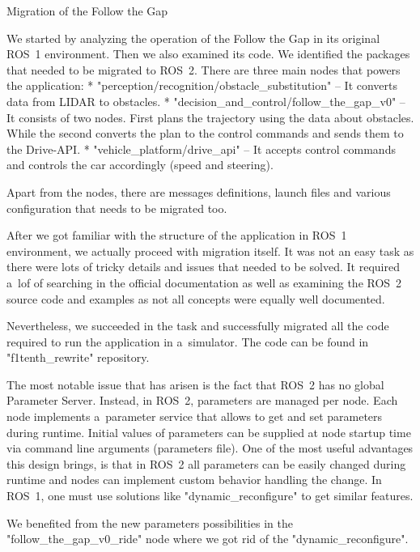  Migration of the Follow the Gap

We started by analyzing the operation of the Follow the Gap in its original ROS~1 environment.
Then we also examined its code. We identified the packages that needed to be migrated to ROS~2.
There are three main nodes that powers the application:
\begitems
* "perception/recognition/obstacle_substitution" – It converts data from LIDAR to obstacles.
* "decision_and_control/follow_the_gap_v0" – It consists of two nodes. First plans the trajectory using the data
about obstacles.
While the second converts the plan to the control commands and sends them to the Drive-API.
* "vehicle_platform/drive_api" – It accepts control commands and controls the car accordingly (speed and steering).
\enditems

Apart from the nodes, there are messages definitions, launch files and various configuration that needs to be
migrated too.

After we got familiar with the structure of the application in ROS~1 environment, we actually proceed with migration
itself. It was not an easy task as there were lots of tricky details and issues that needed to be solved.
It required a~lof of searching in the official documentation as well as examining the ROS~2 source code and examples
as not all concepts were equally well documented.

Nevertheless, we {\sbf succeeded} in the task and {\sbf successfully migrated} all the code required to run the
application in a~simulator. The code can be found
in "f1tenth_rewrite" repository.

The most notable issue that has arisen is the fact that ROS~2 has no global Parameter Server.
Instead, in ROS~2, parameters are managed per node. Each node implements a~parameter service that allows to get and
set parameters during runtime. Initial values of parameters can be supplied at node startup time via command line
arguments (parameters file). One of the most useful advantages this design brings, is that in ROS~2 all parameters can
be easily changed during runtime and nodes can implement custom behavior handling the change. In ROS~1, one must use
solutions like "dynamic_reconfigure" to get similar features.

We benefited from the new parameters possibilities in the "follow_the_gap_v0_ride" node where we got rid of the
"dynamic_reconfigure".

